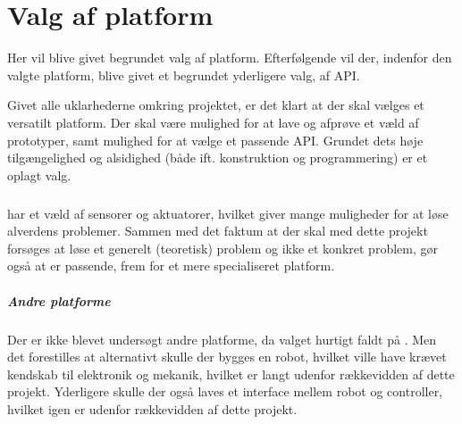 
\chapter{Valg af platform}
Her vil blive givet begrundet valg af platform.
Efterfølgende vil der, indenfor den valgte platform, blive givet et begrundet yderligere valg, af API.

Givet alle uklarhederne omkring projektet, er det klart at der skal vælges et versatilt platform.
Der skal være mulighed for at lave og afprøve et væld af prototyper, samt mulighed for at vælge et passende API.
Grundet dets høje tilgængelighed og alsidighed (både ift. konstruktion og programmering) er \legoms et oplagt valg.


\paragraph{\legoms} har et væld af sensorer og aktuatorer, hvilket giver mange muligheder for at løse alverdens problemer.
Sammen med det faktum at der skal med dette projekt forsøges at løse et generelt (teoretisk) problem og ikke et konkret problem, gør også at \legoms er passende, frem for et mere specialiseret platform.


\paragraph{Andre platforme}
Der er ikke blevet undersøgt andre platforme, da valget hurtigt faldt på \legoms.
Men det forestilles at alternativt skulle der bygges en robot, hvilket ville have krævet kendskab til elektronik og mekanik, hvilket er langt udenfor rækkevidden af dette projekt.
Yderligere skulle der også laves et interface mellem robot og controller, hvilket igen er udenfor rækkevidden af dette projekt.


